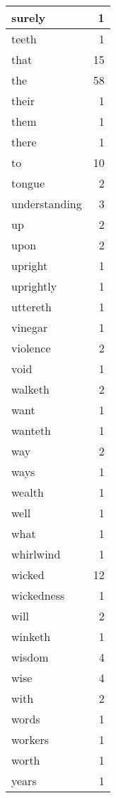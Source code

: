 \begin{center}
\begin{longtable}{l|r}
surely & 1\\ \hline 
teeth & 1\\ \hline 
that & 15\\ \hline 
the & 58\\ \hline 
their & 1\\ \hline 
them & 1\\ \hline 
there & 1\\ \hline 
to & 10\\ \hline 
tongue & 2\\ \hline 
understanding & 3\\ \hline 
up & 2\\ \hline 
upon & 2\\ \hline 
upright & 1\\ \hline 
uprightly & 1\\ \hline 
uttereth & 1\\ \hline 
vinegar & 1\\ \hline 
violence & 2\\ \hline 
void & 1\\ \hline 
walketh & 2\\ \hline 
want & 1\\ \hline 
wanteth & 1\\ \hline 
way & 2\\ \hline 
ways & 1\\ \hline 
wealth & 1\\ \hline 
well & 1\\ \hline 
what & 1\\ \hline 
whirlwind & 1\\ \hline 
wicked & 12\\ \hline 
wickedness & 1\\ \hline 
will & 2\\ \hline 
winketh & 1\\ \hline 
wisdom & 4\\ \hline 
wise & 4\\ \hline 
with & 2\\ \hline 
words & 1\\ \hline 
workers & 1\\ \hline 
worth & 1\\ \hline 
years & 1\\ \hline 
\end{longtable}  
\end{center}  


  
\normalsize  

  
  

